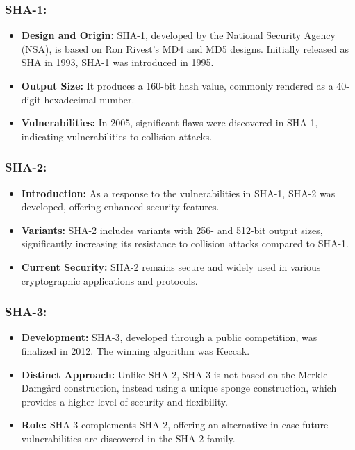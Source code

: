 \documentclass[12pt]{article}
\begin{document}
\subsubsection*{SHA-1:}
\begin{itemize}
    \item \textbf{Design and Origin:} SHA-1, developed by the National Security Agency (NSA), is based on Ron Rivest's MD4 and MD5 designs. Initially released as SHA in 1993, SHA-1 was introduced in 1995.
    \item \textbf{Output Size:} It produces a 160-bit hash value, commonly rendered as a 40-digit hexadecimal number.
    \item \textbf{Vulnerabilities:} In 2005, significant flaws were discovered in SHA-1, indicating vulnerabilities to collision attacks.
\end{itemize}

\subsubsection*{SHA-2:}
\begin{itemize}
    \item \textbf{Introduction:} As a response to the vulnerabilities in SHA-1, SHA-2 was developed, offering enhanced security features.
    \item \textbf{Variants:} SHA-2 includes variants with 256- and 512-bit output sizes, significantly increasing its resistance to collision attacks compared to SHA-1.
    \item \textbf{Current Security:} SHA-2 remains secure and widely used in various cryptographic applications and protocols.
\end{itemize}

\subsubsection*{SHA-3:}
\begin{itemize}
    \item \textbf{Development:} SHA-3, developed through a public competition, was finalized in 2012. The winning algorithm was Keccak.
    \item \textbf{Distinct Approach:} Unlike SHA-2, SHA-3 is not based on the Merkle-Damgård construction, instead using a unique sponge construction, which provides a higher level of security and flexibility.
    \item \textbf{Role:} SHA-3 complements SHA-2, offering an alternative in case future vulnerabilities are discovered in the SHA-2 family.
\end{itemize}
\end{document}
